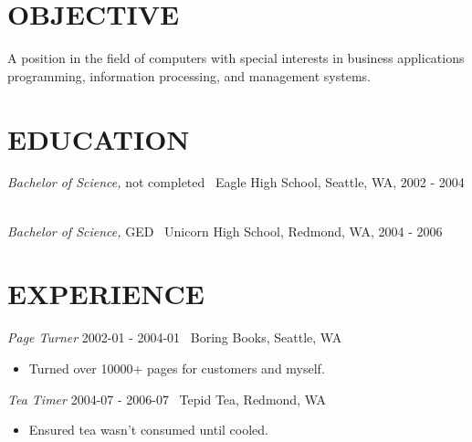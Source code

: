 \documentclass[line,margin]{res}
\begin{document}
\address{New York, NY 11235}
\address{123-456-7890}

 
\begin{resume}
 
\section{OBJECTIVE} A position in the field of computers with special interests in business applications programming, information processing, and management systems.
 
 
\section{EDUCATION} 
                
                {\sl Bachelor of Science,} not completed \
                Eagle High School, Seattle, WA, 
                2002 - 2004 \
                
                {\sl Bachelor of Science,} GED \
                Unicorn High School, Redmond, WA, 
                2004 - 2006 \
                
 
\section{EXPERIENCE} 


{\sl Page Turner} \hfill 2002-01 - 2004-01 \
                Boring Books, 
                Seattle, WA
                 \begin{itemize}  \itemsep -2pt %
                 \item Turned over 10000+ pages for customers and myself.
                \end{itemize}

{\sl Tea Timer} \hfill 2004-07 - 2006-07 \
                Tepid Tea, 
                Redmond, WA
                 \begin{itemize}  \itemsep -2pt %
                 \item Ensured tea wasn't consumed until cooled.
                \end{itemize}
 

\end{resume}
\end{document}
